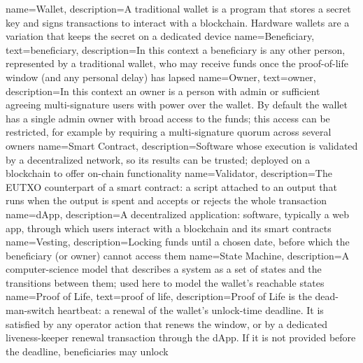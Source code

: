 
\makeglossaries

{
    name=Wallet,
    description={A traditional wallet is a program that stores a secret key and signs transactions to interact with a blockchain. Hardware wallets are a variation that keeps the secret on a dedicated device}
}
{
    name=Beneficiary,
    text={beneficiary},
    description={In this context a beneficiary is any other person, represented by a traditional wallet, who may receive funds once the proof-of-life window (and any personal delay) has lapsed}
}
{
    name=Owner,
    text={owner},
    description={In this context an owner is a person with admin or sufficient agreeing multi-signature users with power over the wallet. By default the wallet has a single admin owner with broad access to the funds; this access can be restricted, for example by requiring a multi-signature quorum across several owners}
}
{
    name=Smart Contract,
    description={Software whose execution is validated by a decentralized network, so its results can be trusted; deployed on a blockchain to offer on-chain functionality}
}
{
    name=Validator,
    description={The EUTXO counterpart of a smart contract: a script attached to an output that runs when the output is spent and accepts or rejects the whole transaction}
}
{
    name=dApp,
    description={A decentralized application: software, typically a web app, through which users interact with a blockchain and its smart contracts}
}
{
    name=Vesting,
    description={Locking funds until a chosen date, before which the beneficiary (or owner) cannot access them}
}
{
    name=State Machine,
    description={A computer-science model that describes a system as a set of states and the transitions between them; used here to model the wallet's reachable states}
}
{
    name=Proof of Life,
    text={proof of life},
    description={Proof of Life is the dead-man-switch heartbeat: a renewal of the wallet's unlock-time deadline. It is satisfied by any operator action that renews the window, or by a dedicated liveness-keeper renewal transaction through the dApp. If it is not provided before the deadline, beneficiaries may unlock}
}
